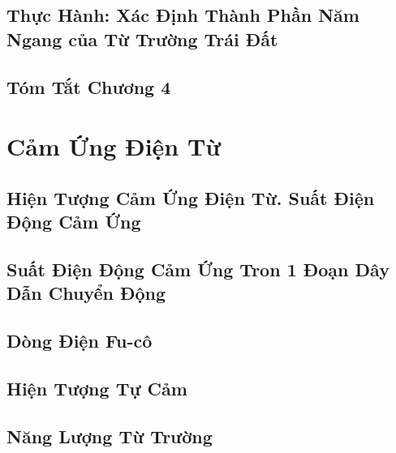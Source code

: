 \documentclass[oneside]{book}
\numberwithin{equation}{section}
\begin{document}
\section{Thực Hành: Xác Định Thành Phần Năm Ngang của Từ Trường Trái Đất}


\section{Tóm Tắt Chương 4}


\chapter{Cảm Ứng Điện Từ}

\section{Hiện Tượng Cảm Ứng Điện Từ. Suất Điện Động Cảm Ứng}


\section{Suất Điện Động Cảm Ứng Tron 1 Đoạn Dây Dẫn Chuyển Động}


\section{Dòng Điện Fu-cô}


\section{Hiện Tượng Tự Cảm}


\section{Năng Lượng Từ Trường}
\end{document}
